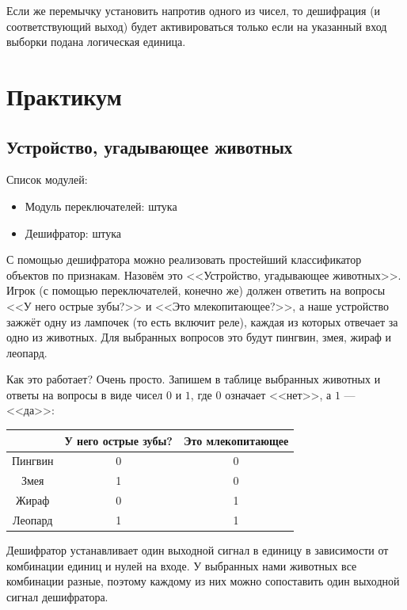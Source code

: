 Если же перемычку установить напротив одного из чисел, то дешифрация (и соответствующий выход)
будет активироваться только если на указанный вход выборки подана логическая единица.

\section{Практикум}

\subsection{Устройство, угадывающее животных}

Список модулей:
\begin{itemize}
    \item Модуль переключателей:  штука
    \item Дешифратор:  штука
\end{itemize}



С помощью дешифратора можно реализовать простейший классификатор объектов по признакам.
Назовём это <<Устройство, угадывающее животных>>. Игрок (с помощью переключателей,
конечно же) должен ответить на вопросы
<<У него острые зубы?>> и <<Это млекопитающее?>>, а наше устройство зажжёт одну из лампочек (то есть включит
реле), каждая из которых отвечает за одно из животных. Для выбранных вопросов это будут пингвин, змея,
жираф и леопард.


Как это работает? Очень просто. Запишем в таблице выбранных животных и ответы на вопросы
в виде чисел $0$ и $1$, где $0$ означает <<нет>>, а $1$ --- <<да>>:

\begin{center}
\begin{tabular}{|c|c|c|}
\hline
 & У него острые зубы? & Это млекопитающее \\
\hline
Пингвин & 0 & 0 \\
\hline
Змея & 1 & 0 \\
\hline
Жираф & 0 & 1 \\
\hline
Леопард & 1 & 1 \\
\hline
\end{tabular}
\end{center}

Дешифратор устанавливает один выходной сигнал в единицу в зависимости от комбинации
единиц и нулей на входе. У выбранных нами животных все комбинации разные,
поэтому каждому из них можно сопоставить один выходной сигнал дешифратора.


